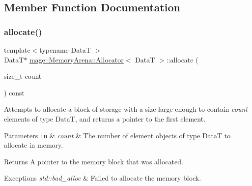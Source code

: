 \subsection{Member Function Documentation}
\hypertarget{classmage_1_1_memory_arena_1_1_allocator_a46d428590d87f47742abc173858ccc95}{}\label{classmage_1_1_memory_arena_1_1_allocator_a46d428590d87f47742abc173858ccc95} 
\subsubsection{\texorpdfstring{allocate()}{allocate()}\hspace{0.1cm}{\footnotesize\ttfamily [1/2]}}
{\footnotesize\ttfamily template$<$typename DataT $>$ \\
DataT$\ast$ \hyperlink{classmage_1_1_memory_arena_1_1_allocator}{mage\+::\+Memory\+Arena\+::\+Allocator}$<$ DataT $>$\+::allocate (\begin{DoxyParamCaption}\item[{size\+\_\+t}]{count }\end{DoxyParamCaption}) const}

Attempts to allocate a block of storage with a size large enough to contain {\itshape count} elements of type {\ttfamily DataT}, and returns a pointer to the first element.


\begin{DoxyParams}[1]{Parameters}
\mbox{\tt in}  & {\em count} & The number of element objects of type {\ttfamily DataT} to allocate in memory. \\
\hline
\end{DoxyParams}
\begin{DoxyReturn}{Returns}
A pointer to the memory block that was allocated. 
\end{DoxyReturn}

\begin{DoxyExceptions}{Exceptions}
{\em std\+::bad\+\_\+alloc} & Failed to allocate the memory block. \\
\hline
\end{DoxyExceptions}
\hypertarget{classmage_1_1_memory_arena_1_1_allocator_a699a98f902dddd5ad2b8477b8ed5f77b}{}\label{classmage_1_1_memory_arena_1_1_allocator_a699a98f902dddd5ad2b8477b8ed5f77b} 
